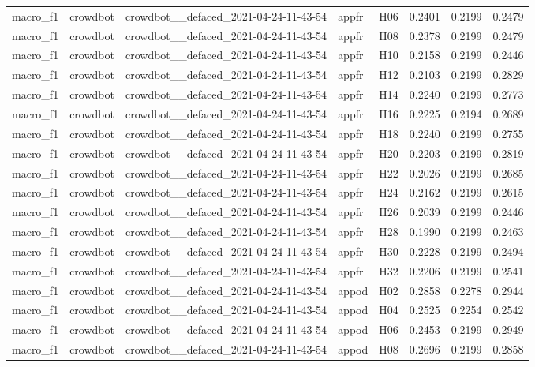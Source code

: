 \begin{table}[tbp]
\begin{tabular}{lllllrrr}
macro\_f1 & crowdbot & crowdbot\_\_defaced\_2021-04-24-11-43-54 & appfr & H06 & 0.2401 & 0.2199 & 0.2479 \\
macro\_f1 & crowdbot & crowdbot\_\_defaced\_2021-04-24-11-43-54 & appfr & H08 & 0.2378 & 0.2199 & 0.2479 \\
macro\_f1 & crowdbot & crowdbot\_\_defaced\_2021-04-24-11-43-54 & appfr & H10 & 0.2158 & 0.2199 & 0.2446 \\
macro\_f1 & crowdbot & crowdbot\_\_defaced\_2021-04-24-11-43-54 & appfr & H12 & 0.2103 & 0.2199 & 0.2829 \\
macro\_f1 & crowdbot & crowdbot\_\_defaced\_2021-04-24-11-43-54 & appfr & H14 & 0.2240 & 0.2199 & 0.2773 \\
macro\_f1 & crowdbot & crowdbot\_\_defaced\_2021-04-24-11-43-54 & appfr & H16 & 0.2225 & 0.2194 & 0.2689 \\
macro\_f1 & crowdbot & crowdbot\_\_defaced\_2021-04-24-11-43-54 & appfr & H18 & 0.2240 & 0.2199 & 0.2755 \\
macro\_f1 & crowdbot & crowdbot\_\_defaced\_2021-04-24-11-43-54 & appfr & H20 & 0.2203 & 0.2199 & 0.2819 \\
macro\_f1 & crowdbot & crowdbot\_\_defaced\_2021-04-24-11-43-54 & appfr & H22 & 0.2026 & 0.2199 & 0.2685 \\
macro\_f1 & crowdbot & crowdbot\_\_defaced\_2021-04-24-11-43-54 & appfr & H24 & 0.2162 & 0.2199 & 0.2615 \\
macro\_f1 & crowdbot & crowdbot\_\_defaced\_2021-04-24-11-43-54 & appfr & H26 & 0.2039 & 0.2199 & 0.2446 \\
macro\_f1 & crowdbot & crowdbot\_\_defaced\_2021-04-24-11-43-54 & appfr & H28 & 0.1990 & 0.2199 & 0.2463 \\
macro\_f1 & crowdbot & crowdbot\_\_defaced\_2021-04-24-11-43-54 & appfr & H30 & 0.2228 & 0.2199 & 0.2494 \\
macro\_f1 & crowdbot & crowdbot\_\_defaced\_2021-04-24-11-43-54 & appfr & H32 & 0.2206 & 0.2199 & 0.2541 \\
macro\_f1 & crowdbot & crowdbot\_\_defaced\_2021-04-24-11-43-54 & appod & H02 & 0.2858 & 0.2278 & 0.2944 \\
macro\_f1 & crowdbot & crowdbot\_\_defaced\_2021-04-24-11-43-54 & appod & H04 & 0.2525 & 0.2254 & 0.2542 \\
macro\_f1 & crowdbot & crowdbot\_\_defaced\_2021-04-24-11-43-54 & appod & H06 & 0.2453 & 0.2199 & 0.2949 \\
macro\_f1 & crowdbot & crowdbot\_\_defaced\_2021-04-24-11-43-54 & appod & H08 & 0.2696 & 0.2199 & 0.2858 \\

\end{tabular}
\end{table}
